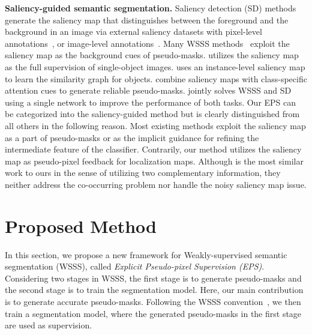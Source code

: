 \documentclass[final]{cvpr}
\begin{document}
\vspace{1mm}
\noindent\textbf{Saliency-guided semantic segmentation.}
Saliency detection (SD) methods generate the saliency map that distinguishes between the foreground and the background in an image via external saliency datasets with pixel-level annotations~\cite{hou2017deeply, xiao2018deep, zhao2019pyramid}, or image-level annotations~\cite{wang2017learning}. Many WSSS methods~\cite{fan2020cian, huang2018weakly, lee2019ficklenet, li2018tell, wei2017object, wei2018revisiting} exploit the saliency map as the background cues of pseudo-masks. \cite{wei2016stc} utilizes the saliency map as the full supervision of single-object images. \cite{fan2018associating} uses an instance-level saliency map to learn the similarity graph for objects. \cite{chaudhry_dcsp_2017, wang2018weakly, yao2020saliency} combine saliency maps with class-specific attention cues to generate reliable pseudo-masks. \cite{zeng2019joint} jointly solves WSSS and SD using a single network to improve the performance of both tasks. Our EPS can be categorized into the saliency-guided method but is clearly distinguished from all others in the following reason. Most existing methods exploit the saliency map as a part of pseudo-masks or as the implicit guidance for refining the intermediate feature of the classifier. Contrarily, our method utilizes the saliency map as pseudo-pixel feedback for localization maps. Although \cite{zeng2019joint} is the most similar work to ours in the sense of utilizing two complementary information, they neither address the co-occurring problem nor handle the noisy saliency map issue.
 


\section{Proposed Method}

In this section, we propose a new framework for Weakly-supervised semantic segmentation (WSSS), called \emph{Explicit Pseudo-pixel Supervision (EPS)}. Considering two stages in WSSS, the first stage is to generate pseudo-masks and the second stage is to train the segmentation model. Here, our main contribution is to generate accurate pseudo-masks. Following the WSSS convention~\cite{fan2020learning,jiang2019integral,lee2019ficklenet,li2018tell,wang2020self,wei2017object}, we then train a segmentation model, where the generated pseudo-masks in the first stage are used as supervision.
\end{document}
